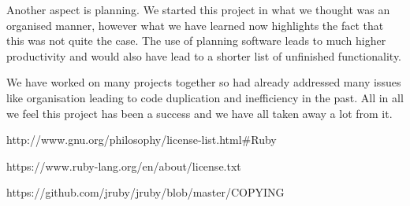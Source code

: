 \documentclass[a4wide, 11pt]{article}
\begin{document}
Another aspect is planning. We started this project in what we thought was an organised manner, however what we have learned now highlights the fact that this was not quite the case. The use of planning software leads to much higher productivity and would also have lead to a shorter list of unfinished functionality. 

We have worked on many projects together so had already addressed many issues like organisation leading to code duplication and inefficiency in the past. All in all we feel this project has been a success and we have all taken away a lot from it.

\begin{thebibliography}{9}

  http://www.gnu.org/philosophy/license-list.html\#Ruby

  https://www.ruby-lang.org/en/about/license.txt

  https://github.com/jruby/jruby/blob/master/COPYING
\end{thebibliography}
\end{document}
